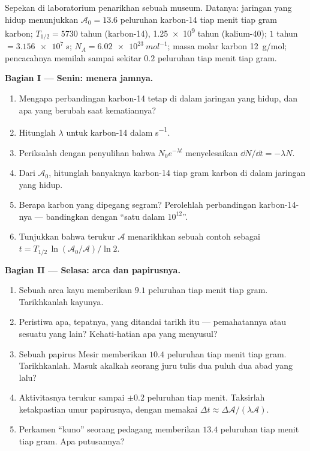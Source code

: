 \begin{problem}
\label{pb:g12:radioactive-decay:1}
Sepekan di laboratorium penarikhan sebuah museum. Datanya: jaringan yang hidup menunjukkan
$\mathcal A_0 = 13.6$ peluruhan karbon-14 tiap menit tiap gram karbon;
$T_{1/2} = \num{5730}$ tahun (karbon-14), \num{1.25e9} tahun
(kalium-40); $1$ tahun $= \qty{3.156e7}{s}$;
$N_A = \qty{6.02e23}{mol^{-1}}$; massa molar karbon \qty{12}{g/mol};
pencacahnya memilah sampai sekitar $0.2$ peluruhan tiap menit tiap gram.

\medskip
\noindent\textbf{Bagian I --- Senin: menera jamnya.}
\begin{enumerate}
  \item Mengapa perbandingan karbon-14 tetap di dalam jaringan yang hidup, dan
        apa yang berubah saat kematiannya?
  \item Hitunglah $\lambda$ untuk karbon-14 dalam \unit{s^{-1}}.
  \item Periksalah dengan penyulihan bahwa $N_0 e^{-\lambda t}$ menyelesaikan
        $\dd N/\dd t = -\lambda N$.
  \item Dari $\mathcal A_0$, hitunglah banyaknya  karbon-14 tiap
        gram karbon di dalam jaringan yang hidup.
  \item Berapa  karbon yang dipegang segram? Perolehlah perbandingan
        karbon-14-nya --- bandingkan dengan ``satu dalam $10^{12}$''.
  \item Tunjukkan bahwa  terukur $\mathcal A$ menarikhkan sebuah contoh sebagai
        $t = T_{1/2}\,\ln(\mathcal A_0/\mathcal A)/\ln 2$.
\end{enumerate}

\medskip
\noindent\textbf{Bagian II --- Selasa: arca dan papirusnya.}
\begin{enumerate}[resume]
  \item Sebuah arca kayu memberikan $9.1$ peluruhan tiap menit tiap gram. Tarikhkanlah
        kayunya.
  \item Peristiwa apa, tepatnya, yang ditandai tarikh itu --- pemahatannya atau
        sesuatu yang lain? Kehati-hatian apa yang menyusul?
  \item Sebuah papirus Mesir memberikan $10.4$ peluruhan tiap menit tiap gram. Tarikhkanlah.
        Masuk akalkah seorang juru tulis dua puluh dua abad yang lalu?
  \item Aktivitasnya terukur sampai $\pm 0.2$ peluruhan tiap menit. Taksirlah
        ketakpastian umur papirusnya, dengan memakai
        $\Delta t \approx \Delta\mathcal A/(\lambda \mathcal A)$.
  \item Perkamen ``kuno'' seorang pedagang memberikan $13.4$ peluruhan tiap menit
        tiap gram. Apa putusannya?
\end{enumerate}


\end{problem}
